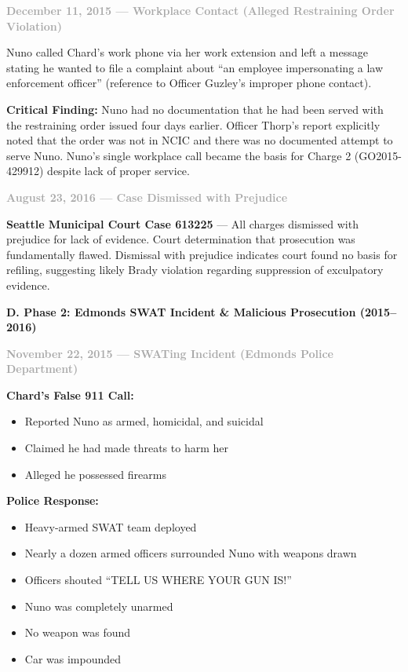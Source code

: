 \documentclass[11pt, letterpaper]{article}
\newcommand{\subsectiontitle}[1]{\vspace{0.15in}\noindent\textcolor{NavyBlue}{\textbf{#1}}\vspace{0.05in}}
\newcommand{\subsubsectiontitle}[1]{\vspace{0.1in}\noindent\textcolor{DarkGray}{\textbf{#1}}\vspace{0.05in}}
\begin{document}
\subsubsectiontitle{December 11, 2015 --- Workplace Contact (Alleged Restraining Order Violation)}

Nuno called Chard's work phone via her work extension and left a message stating he wanted to file a complaint about ``an employee impersonating a law enforcement officer'' (reference to Officer Guzley's improper phone contact).

\textbf{Critical Finding:} Nuno had no documentation that he had been served with the restraining order issued four days earlier. Officer Thorp's report explicitly noted that the order was not in NCIC and there was no documented attempt to serve Nuno. Nuno's single workplace call became the basis for Charge 2 (GO2015-429912) despite lack of proper service.

\subsubsectiontitle{August 23, 2016 --- Case Dismissed with Prejudice}

\textbf{Seattle Municipal Court Case 613225} --- All charges dismissed with prejudice for lack of evidence. Court determination that prosecution was fundamentally flawed. Dismissal with prejudice indicates court found no basis for refiling, suggesting likely Brady violation regarding suppression of exculpatory evidence.

\subsectiontitle{D. Phase 2: Edmonds SWAT Incident \& Malicious Prosecution (2015--2016)}

\subsubsectiontitle{November 22, 2015 --- SWATing Incident (Edmonds Police Department)}

\textbf{Chard's False 911 Call:}
\begin{itemize}[leftmargin=*,itemsep=2pt]
    \item Reported Nuno as armed, homicidal, and suicidal
    \item Claimed he had made threats to harm her
    \item Alleged he possessed firearms
\end{itemize}

\textbf{Police Response:}
\begin{itemize}[leftmargin=*,itemsep=2pt]
    \item Heavy-armed SWAT team deployed
    \item Nearly a dozen armed officers surrounded Nuno with weapons drawn
    \item Officers shouted ``TELL US WHERE YOUR GUN IS!''
    \item Nuno was completely unarmed
    \item No weapon was found
    \item Car was impounded
\end{itemize}
\end{document}
